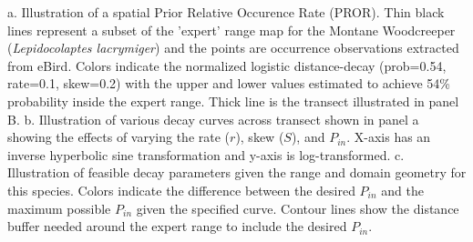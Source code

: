 a. Illustration of a spatial Prior Relative Occurence Rate (PROR).  Thin black lines represent a subset of the 'expert' range map for the Montane Woodcreeper (\textit{Lepidocolaptes lacrymiger}) and the points are occurrence observations extracted from eBird.  Colors indicate the normalized logistic distance-decay (prob=0.54, rate=0.1, skew=0.2) with the upper and lower values estimated to achieve 54\% probability inside the expert range. Thick line is the transect illustrated in panel B.  b. Illustration of various decay curves across transect shown in panel a showing the effects of varying the rate ($r$), skew ($S$), and $P_{in}$. X-axis has an inverse hyperbolic sine transformation and y-axis is log-transformed.   c. Illustration of feasible decay parameters given the range and domain geometry for this species.  Colors indicate the difference between the desired $P_{in}$ and the maximum possible  $P_{in}$ given the specified curve.  Contour lines show the distance buffer needed around the expert range to include the desired  $P_{in}$.